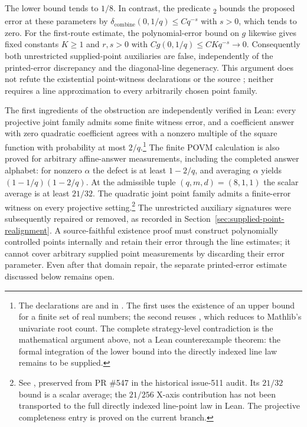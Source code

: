 \documentclass[11pt]{article}
\begin{document}
The lower bound tends to $1/8$. In contrast, the predicate
\textsubscript{2} bounds the proposed error at these parameters by
$\delta_{\mathrm{combine}}(0,1/q)\le Cq^{-s}$ with $s>0$, which tends to zero.
For the first-route estimate, the polynomial-error bound on $g$ likewise gives
fixed constants $K\ge1$ and $r,s>0$ with
$C g(0,1/q)\le CKq^{-s}\longrightarrow0$.
Consequently both unrestricted supplied-point auxiliaries are false,
independently of the printed-error discrepancy and the diagonal-line degeneracy.
This argument does not refute the existential point-witness declarations or the source
; neither requires a line approximation to every arbitrarily
chosen point family.

The first ingredients of the obstruction are independently verified in Lean:
every projective joint family admits some finite witness error, and a coefficient
answer with zero quadratic coefficient agrees with a nonzero multiple of the
square function with probability at most $2/q$.\footnote{The declarations are
 and
 in
. The first uses the
existence of an upper bound for a finite set of real numbers; the second reuses
, which reduces to Mathlib's
univariate root count. The complete strategy-level contradiction is the
mathematical argument above, not a Lean counterexample theorem: the formal
integration of the lower bound into the directly indexed line law remains
to be supplied.}
The finite POVM calculation is also proved for arbitrary affine-answer
measurements, including the completed answer alphabet: for nonzero $\alpha$
the defect is at least $1-2/q$, and averaging $\alpha$ yields
$(1-1/q)(1-2/q)$. At the admissible tuple $(q,m,d)=(8,1,1)$ the scalar
average is at least $21/32$. The quadratic joint point family admits a
finite-error witness on every projective setting.\footnote{See
, preserved from
PR \#547 in the historical issue-511 audit. Its $21/32$ bound is a scalar
average; the $21/256$ X-axis contribution has not been transported to the
full directly indexed line-point law in Lean. The projective completeness
entry  is proved on the current branch.}
The unrestricted auxiliary signatures were subsequently repaired or removed,
as recorded in Section~\ref{sec:supplied-point-realignment}. A source-faithful existence
proof must construct polynomially controlled points internally and retain their error
through the line estimates; it cannot cover arbitrary supplied point
measurements by discarding their error parameter. Even after that domain
repair, the separate printed-error estimate discussed below remains open.
\end{document}

